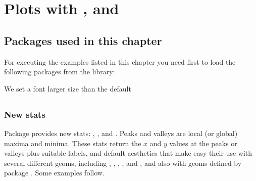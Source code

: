 \documentclass[paper=a4,10pt,div=17,headsepline,BCOR=12mm,twoside,open=right]{scrbook}\usepackage{knitr}
\begin{document}
\chapter[Plots with ggpplot, ggrepel and ggpmisc]{Plots with \ggplot, \ggrepel and \ggpmisc}\label{chap:R:plotting}

\section{Packages used in this chapter}

For executing the examples listed in this chapter you need first to load the following packages from the library:

\begin{knitrout}\footnotesize
{}\color{fgcolor}\begin{kframe}
\begin{alltt}
\end{alltt}
\end{kframe}
\end{knitrout}

We set a font larger size than the default
\begin{knitrout}\footnotesize
{}\color{fgcolor}\begin{kframe}
\begin{alltt}
\hlstd{(}\hlstd{(}\hlstd{))}
\end{alltt}
\end{kframe}
\end{knitrout}




\section[ggpmisc]{\ggpmisc}

\subsection{New stats}

Package \ggpmisc provides new stats: , , and . Peaks and valleys are local (or global) maxima and minima. These stats return the $x$ and $y$ values at the peaks or valleys plus suitable labels, and default aesthetics that make easy their use with several different geoms, including , , , ,  and , and also with geoms defined by package \ggrepel. Some examples follow.
\end{document}
